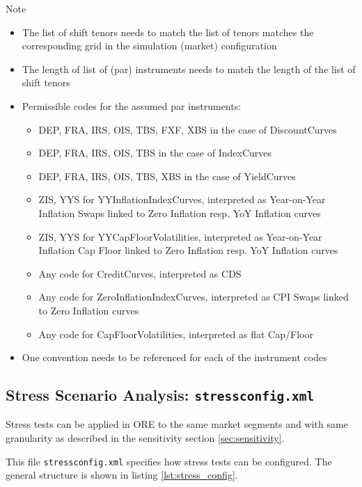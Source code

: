 \documentclass[12pt, a4paper]{article}
\begin{document}
{Note
\begin{itemize}
\item The list of shift tenors needs to match the list of tenors matches the corresponding grid in the simulation (market) configuration
\item The length of list of (par) instruments needs to match the length of the list of shift tenors
\item Permissible codes for the assumed par instruments:
	\begin{itemize}
	\item DEP, FRA, IRS, OIS, TBS, FXF, XBS in the case of DiscountCurves 
	\item DEP, FRA, IRS, OIS, TBS in the case of IndexCurves
	\item DEP, FRA, IRS, OIS, TBS, XBS in the case of YieldCurves 
	\item ZIS, YYS for YYInflationIndexCurves, interpreted as Year-on-Year Inflation Swaps linked to Zero Inflation resp. YoY Inflation curves
	\item ZIS, YYS for YYCapFloorVolatilities, interpreted as Year-on-Year Inflation Cap Floor linked to Zero Inflation resp. YoY Inflation curves
	\item Any code for CreditCurves, interpreted as CDS
	\item Any code for ZeroInflationIndexCurves, interpreted as CPI Swaps linked to Zero Inflation curves
	\item Any code for CapFloorVolatilities, interpreted as flat Cap/Floor
	\end{itemize}
\item One convention needs to be referenced for each of the instrument codes	
\end{itemize}

\subsection{Stress Scenario Analysis: {\tt stressconfig.xml}}\label{sec:stress}

Stress tests can be applied in ORE to the same market segments and with same granularity as described in the sensitivity section \ref{sec:sensitivity}.

\medskip
This file {\tt stressconfig.xml} specifies how stress tests can be configured. The general structure is shown in listing
\ref{lst:stress_config}.

}
\end{document}
